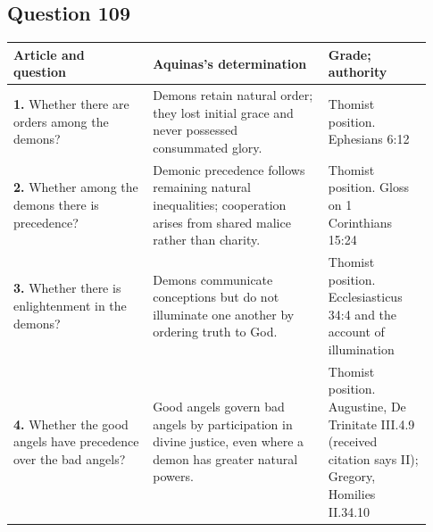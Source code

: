 \subsection{Question 109}
\begin{longtable}{@{}>{\raggedright\arraybackslash}p{0.31\linewidth}>{\raggedright\arraybackslash}p{0.39\linewidth}>{\raggedright\arraybackslash}p{0.23\linewidth}@{}}
\toprule
Article and question & Aquinas's determination & Grade; authority\\
\midrule\endhead
\textbf{1.} Whether there are orders among the demons? & Demons retain natural order; they lost initial grace and never possessed consummated glory. & Thomist position. Ephesians 6:12\\
\textbf{2.} Whether among the demons there is precedence? & Demonic precedence follows remaining natural inequalities; cooperation arises from shared malice rather than charity. & Thomist position. Gloss on 1 Corinthians 15:24\\
\textbf{3.} Whether there is enlightenment in the demons? & Demons communicate conceptions but do not illuminate one another by ordering truth to God. & Thomist position. Ecclesiasticus 34:4 and the account of illumination\\
\textbf{4.} Whether the good angels have precedence over the bad angels? & Good angels govern bad angels by participation in divine justice, even where a demon has greater natural powers. & Thomist position. Augustine, De Trinitate III.4.9 (received citation says II); Gregory, Homilies II.34.10\\
\bottomrule
\end{longtable}
